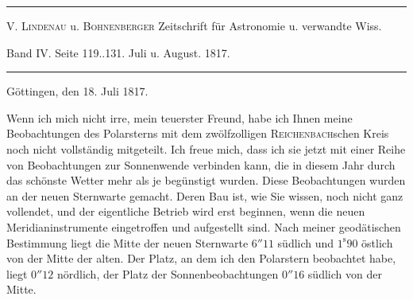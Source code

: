 \clearpage{}\hypertarget{native-398-part-lower}{}\label{native-398-part-lower}
\begin{center}\hrule\vspace{4pt}\fontsize{10}{12}\selectfont
V. \textsc{Lindenau} u. \textsc{Bohnenberger} Zeitschrift für Astronomie u. verwandte Wiss.\par
Band IV. Seite 119..131. Juli u. August. 1817.\par\vspace{4pt}\hrule\vspace{4pt}\end{center}
\begin{flushright}Göttingen, den 18. Juli 1817.\end{flushright}
\par\indent Wenn ich mich nicht irre, mein teuerster Freund, habe ich Ihnen meine Beobachtungen des Polarsterns mit dem zwölfzolligen \textsc{Reichenbach}schen Kreis noch nicht vollständig mitgeteilt. Ich freue mich, dass ich  sie jetzt mit einer Reihe von Beobachtungen zur Sonnenwende verbinden kann, die in diesem Jahr durch das schönste Wetter mehr als je begünstigt wurden. Diese Beobachtungen wurden an der neuen Sternwarte gemacht. Deren Bau ist, wie Sie wissen, noch nicht ganz vollendet, und der eigentliche Betrieb wird erst beginnen, wenn die neuen Meridianinstrumente eingetroffen und aufgestellt sind. Nach meiner geodätischen Bestimmung liegt die Mitte der neuen Sternwarte $6''11$ südlich und $1^{\mathrm s}90$ östlich von der Mitte der alten. Der Platz, an dem ich den Polarstern beobachtet habe, liegt $0''12$ nördlich, der Platz der Sonnenbeobachtungen $0''16$ südlich von der Mitte.

